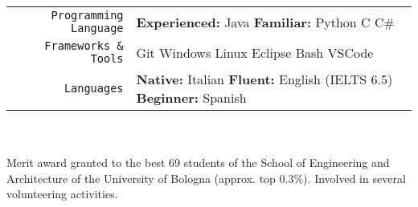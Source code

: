 \documentclass[
    10pt,
    A4,
    english,
    draft = false,
    twoside = false
]{article}
\begin{document}
	\tab \begin{tabular}{r p{}}
		\texttt{\large Programming Language} & \textbf{Experienced:} Java  \tab \textbf{Familiar:} Python \cvContactSep C \cvContactSep C\# \\
		\texttt{\large Frameworks \& Tools} & Git \cvContactSep Windows \cvContactSep Linux \cvContactSep Eclipse \cvContactSep Bash \cvContactSep VSCode \\
		\texttt{\large Languages} & \textbf{Native:} Italian \cvContactSep \textbf{Fluent:} English (IELTS 6.5) \cvContactSep \textbf{Beginner:} Spanish \\
	\end{tabular}\\~\\
	{Merit award granted to the best 69 students of the School of Engineering and Architecture of the University of Bologna (approx. top 0.3\%).}
	{Involved in several volunteering activities.}

\end{document}
